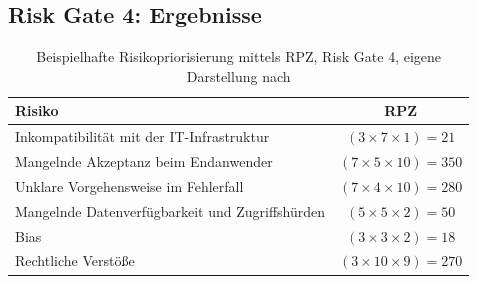 \subsection{Risk Gate 4: Ergebnisse}

\begin{table}[H]
\centering
\begin{tabular}{|p{9cm}|c|}
\hline
\textbf{Risiko} & \textbf{RPZ} \\ \hline
Inkompatibilität mit der IT-Infrastruktur & $(3 \times 7 \times 1) = 21$ \\ \hline
Mangelnde Akzeptanz beim Endanwender & $(7 \times 5 \times 10) = 350$ \\ \hline
Unklare Vorgehensweise im Fehlerfall & $(7 \times 4 \times 10) = 280$ \\ \hline
Mangelnde Datenverfügbarkeit und Zugriffshürden & $(5 \times 5 \times 2) = 50$ \\ \hline
Bias & $(3 \times 3 \times 2) = 18$ \\ \hline
Rechtliche Verstöße & $(3 \times 10 \times 9) = 270$ \\ \hline
\end{tabular}
\caption{Beispielhafte Risikopriorisierung mittels RPZ, Risk Gate 4, eigene Darstellung nach \cite{Bundesministerium_2018}}
\label{tab:cs2_app_rg4_rpz_risiken}
\end{table}

